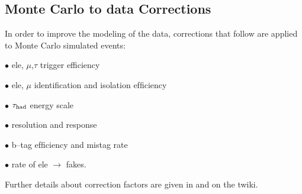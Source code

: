 \subsection{Monte Carlo to data Corrections}
\label{sec:scaleFactors}
In order to improve the modeling of the data, corrections that follow are
 applied  to Monte Carlo simulated events:

$\bullet$ ele, $\mu$,$\tau$ trigger efficiency

$\bullet$ ele, $\mu$ identiﬁcation and isolation efﬁciency

$\bullet$ $\tau_{\rm had}$ energy scale

$\bullet$ \MET resolution and response

$\bullet$ b–tag efﬁciency and mistag rate

$\bullet$ rate of ele $\rightarrow$ \hadtau  fakes.

Further details about correction factors  are given in \cite{} and on the twiki\cite{}.
